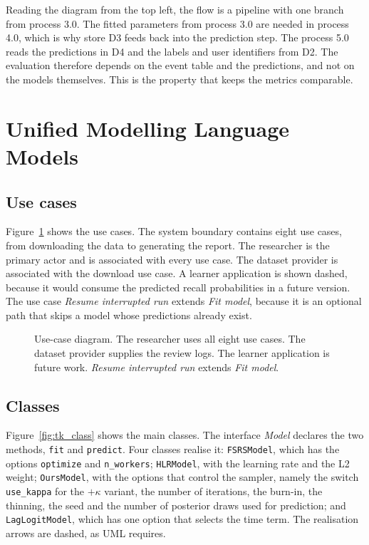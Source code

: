 Reading the diagram from the top left, the flow is a pipeline with one branch from process 3.0. The fitted parameters
from process 3.0 are needed in process 4.0, which is why store D3 feeds back into the prediction step. The
process 5.0 reads the predictions in D4 and the labels and user identifiers from D2. The evaluation therefore depends on the event table and the predictions, and not on the models themselves. This is the property that keeps the metrics comparable.

\section{Unified Modelling Language Models}
\label{sec:design-uml}

\subsection{Use cases}

Figure~\ref{fig:tk_usecase} shows the use cases. The system boundary contains eight use cases, from downloading
the data to generating the report. The researcher is the primary actor and is associated with every use case.
The dataset provider is associated with the download use case. A learner application is shown dashed, because it
would consume the predicted recall probabilities in a future version. The use case \emph{Resume interrupted run}
extends \emph{Fit model}, because it is an optional path that skips a model whose predictions already exist.

\begin{figure}[htbp]
  \centering
  
  \caption{Use-case diagram. The researcher uses all eight use cases. The dataset provider supplies the review logs.
    The learner application is future work. \emph{Resume interrupted run} extends \emph{Fit model}.}
  \label{fig:tk_usecase}
\end{figure}

\subsection{Classes}

Figure~\ref{fig:tk_class} shows the main classes. The interface \emph{Model} declares the two methods, \texttt{fit}
and \texttt{predict}. Four classes realise it: \texttt{FSRSModel}, which has the options \texttt{optimize} and
\texttt{n\_workers}; \texttt{HLRModel}, with the learning rate and the L2 weight; \texttt{OursModel}, with the
options that control the sampler, namely the switch \texttt{use\_kappa} for the $+\kappa$ variant, the number of iterations, the burn-in, the thinning, the seed and the number of posterior draws used for prediction; and \texttt{LagLogitModel}, which has one option that selects the
time term. The realisation arrows are dashed, as UML requires.

